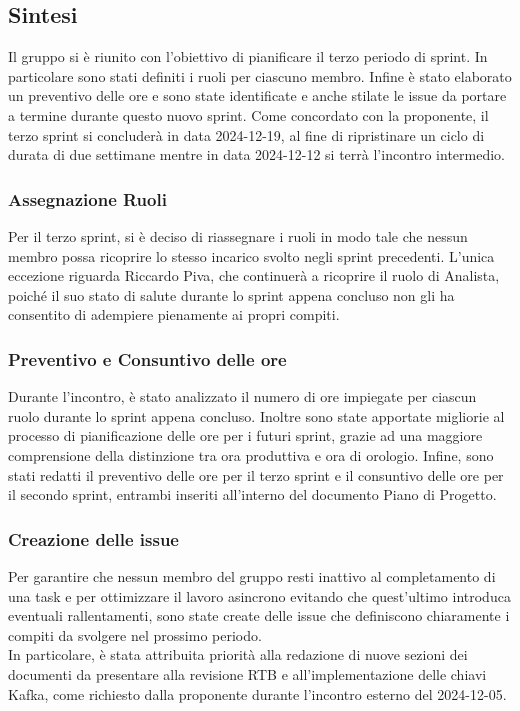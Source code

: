 \documentclass[10pt]{article}
\begin{document}
\subsection{Sintesi}
Il gruppo si è riunito con l'obiettivo di pianificare il terzo periodo di sprint. In particolare sono stati definiti i ruoli per ciascuno membro. Infine è stato elaborato un preventivo delle ore e sono state identificate e anche stilate le issue da portare a termine durante questo nuovo sprint.
Come concordato con la proponente, il terzo sprint si concluderà in data 2024-12-19, al fine di ripristinare un ciclo di durata di due settimane mentre in data 2024-12-12 si terrà l'incontro intermedio.\\

\subsubsection{Assegnazione Ruoli}
Per il terzo sprint, si è deciso di riassegnare i ruoli in modo tale che nessun membro possa ricoprire lo stesso incarico svolto negli sprint precedenti. L'unica eccezione riguarda Riccardo Piva, che continuerà a ricoprire il ruolo di Analista, poiché il suo stato di salute durante lo sprint appena concluso non gli ha consentito di adempiere pienamente ai propri compiti.\\

\subsubsection{Preventivo e Consuntivo delle ore}
Durante l'incontro, è stato analizzato il numero di ore impiegate per ciascun ruolo durante lo sprint appena concluso. Inoltre sono state apportate migliorie al processo di pianificazione delle ore per i futuri sprint, grazie ad una maggiore comprensione della distinzione tra ora produttiva e ora di orologio. Infine, sono stati redatti il preventivo delle ore per il terzo sprint e il consuntivo delle ore per il secondo sprint, entrambi inseriti all'interno del documento Piano di Progetto.\\

\subsubsection{Creazione delle issue}
Per garantire che nessun membro del gruppo resti inattivo al completamento di una task e per ottimizzare il lavoro asincrono evitando che quest'ultimo introduca eventuali rallentamenti, sono state create delle issue che definiscono chiaramente i compiti da svolgere nel prossimo periodo.\\
In particolare, è stata attribuita priorità alla redazione di nuove sezioni dei documenti da presentare alla revisione RTB e all'implementazione delle chiavi Kafka, come richiesto dalla proponente durante l'incontro esterno del 2024-12-05.\\
\end{document}
